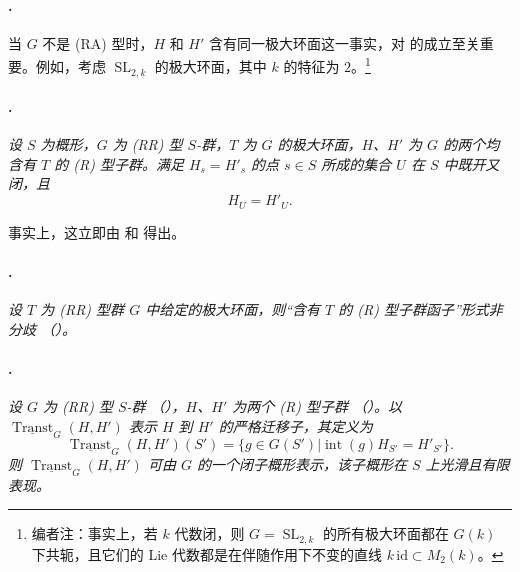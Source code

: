 \paragraph{.}
当 \(G\) 不是 \textup{(RA)} 型时，\(H\) 和 \(H'\) 含有同一极大环面这一事实，对  的成立至关重要。例如，考虑 \(\operatorname{SL}_{2,k}\) 的极大环面，其中 \(k\) 的特征为 \(2\)。\footnote{编者注：事实上，若 \(k\) 代数闭，则 \(G=\operatorname{SL}_{2,k}\) 的所有极大环面都在 \(G(k)\) 下共轭，且它们的 Lie 代数都是在伴随作用下不变的直线 \(k\,\mathrm{id}\subset M_2(k)\)。}

\paragraph{.}
\textit{设 \(S\) 为概形，\(G\) 为 \textup{(RR)} 型 \(S\)-群，\(T\) 为 \(G\) 的极大环面，\(H\)、\(H'\) 为 \(G\) 的两个均含有 \(T\) 的 \textup{(R)} 型子群。满足 \(H_s=H'_s\) 的点 \(s\in S\) 所成的集合 \(U\) 在 \(S\) 中既开又闭，且}
\[
  H_U=H'_U.
\]

事实上，这立即由  和  得出。

\paragraph{.}
\textit{设 \(T\) 为 \textup{(RR)} 型群 \(G\) 中给定的极大环面，则“含有 \(T\) 的 \textup{(R)} 型子群函子”形式非分歧 \textup{（）}。}

\paragraph{.}
\textit{设 \(G\) 为 \textup{(RR)} 型 \(S\)-群 \textup{（）}，\(H\)、\(H'\) 为两个 \textup{(R)} 型子群 \textup{（）}。以 \(\underline{\operatorname{Transt}}_G(H,H')\) 表示 \(H\) 到 \(H'\) 的严格迁移子，其定义为}
\[
  \underline{\operatorname{Transt}}_G(H,H')(S')
  =
  \bigl\{
    g\in G(S')
    \mathrel{\big|}
    \operatorname{int}(g)H_{S'}=H'_{S'}
  \bigr\}.
\]
\textit{则 \(\underline{\operatorname{Transt}}_G(H,H')\) 可由 \(G\) 的一个闭子概形表示，该子概形在 \(S\) 上光滑且有限表现。}

